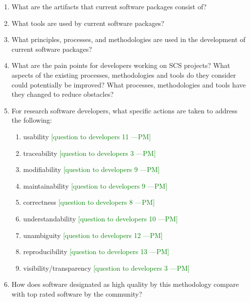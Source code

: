 \documentclass[letterpaper,cleveref]{lipics-v2019}
\newcommand{\authornote}[3]{\textcolor{#1}{[#3 ---#2]}}
\newcommand{\authornote}[3]{}
\newcommand{\pmi}[1]{\authornote{green}{PM}{#1}} %
\theoremstyle{definition}
\begin{document}
\begin{enumerate}
\item What are the artifacts that current software packages consist of? 
\item What tools are used by current software packages?
\item What principles, processes, and methodologies are used in the development of current software packages?
\item What are the pain points for developers working on SCS projects? What aspects of the existing processes, methodologies and tools do they consider could potentially be improved? What processes, methodologies and tools have they changed to reduce obstacles?
\item For research software developers, what specific actions are taken to address the following:
\begin{enumerate}
\item usability \pmi{question to developers 11}
\item traceability \pmi{question to developers 3}
\item modifiability \pmi{question to developers 9}
\item maintainability \pmi{question to developers 9}
\item correctness \pmi{question to developers 8}
\item understandability \pmi{question to developers 10}
\item unambiguity \pmi{question to developers 12}
\item reproducibility \pmi{question to developers 13}
\item visibility/transparency \pmi{question to developers 3}
\end{enumerate} 
\item How does software designated as high quality by this methodology compare with top rated software by the community?
\end{enumerate}
\end{document}
